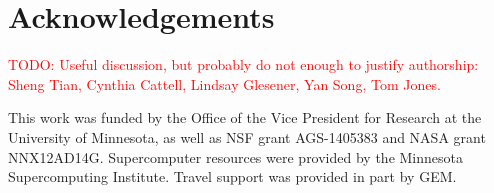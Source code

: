 \documentclass{article}
\newcommand{\todo}[1]{ \textcolor{red}{TODO: #1} }
\begin{document}
\section{Acknowledgements}

\todo{Useful discussion, but probably do not enough to justify authorship: Sheng Tian, Cynthia Cattell, Lindsay Glesener, Yan Song, Tom Jones. }

This work was funded by the Office of the Vice President for Research at the University of Minnesota, as well as NSF grant AGS-1405383 and NASA grant NNX12AD14G. Supercomputer resources were provided by the Minnesota Supercomputing Institute. Travel support was provided in part by GEM.


\end{document}
